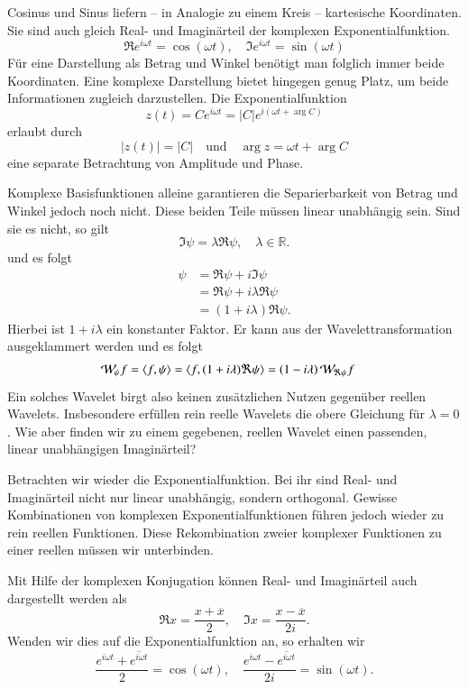 Cosinus und Sinus liefern -- in Analogie zu einem Kreis -- kartesische Koordinaten. 
Sie sind auch gleich Real- und Imaginärteil der komplexen Exponentialfunktion.
\[
\Re e^{i\omega t} = \cos(\omega t), \quad \Im e^{i\omega t} = \sin(\omega t)
\]
Für eine Darstellung als Betrag und Winkel benötigt man folglich immer beide Koordinaten.
Eine komplexe Darstellung bietet hingegen genug Platz, um beide Informationen zugleich darzustellen.
Die Exponentialfunktion
\[
	z(t) = Ce^{i\omega t} = |C|e^{i(\omega t + \arg C)}
\]
erlaubt durch 
\[
	|z(t)| = |C| 
	\quad \text{und}\quad
	\arg z = \omega t + \arg C
\]
eine separate Betrachtung von Amplitude und Phase.


Komplexe Basisfunktionen alleine garantieren die Separierbarkeit von Betrag und Winkel jedoch noch nicht.
Diese beiden Teile müssen linear unabhängig sein.
Sind sie es nicht, so gilt
\[\Im \psi = \lambda \Re \psi, \quad \lambda \in \mathbb R.\]
und es folgt
\begin{align*}
	\psi &= \Re \psi + i \Im \psi\\
	&= \Re \psi + i\lambda \Re \psi\\
	&= (1+i\lambda) \Re \psi.
\end{align*}
Hierbei ist $1+i\lambda$ ein konstanter Faktor. 
Er kann aus der Wavelettransformation ausgeklammert werden und es folgt
\begin{align*}
	\Wave_\psi\! f 
	= \langle f, \psi \rangle
	&= \langle f, (1+i\lambda) \Re \psi \rangle
	= (1-i\lambda) \Wave_{\Re\psi}\! f
\end{align*}
Ein solches Wavelet birgt also keinen zusätzlichen Nutzen gegenüber reellen Wavelets.
Insbesondere erfüllen rein reelle Wavelets die obere Gleichung für $\lambda=0$.
Wie aber finden wir zu einem gegebenen, reellen Wavelet einen passenden, linear unabhängigen Imaginärteil?

Betrachten wir wieder die Exponentialfunktion.
Bei ihr sind Real- und Imaginärteil nicht nur linear unabhängig, sondern orthogonal.
Gewisse Kombinationen von komplexen Exponentialfunktionen führen jedoch wieder zu rein reellen Funktionen.
Diese Rekombination zweier komplexer Funktionen zu einer reellen müssen wir unterbinden.

Mit Hilfe der komplexen Konjugation können Real- und Imaginärteil auch dargestellt werden als
\[
\Re x = \frac{x + \overline x}{2} 
,\quad
\Im x = \frac{x - \overline x}{2i}.
\]
Wenden wir dies auf die Exponentialfunktion an, so erhalten wir
\begin{equation}
	\frac{e^{i\omega t} + \overline{e^{i\omega t}}}{2} = \cos(\omega t)
	,\quad
	\frac{e^{i\omega t} - \overline{e^{i\omega t}}}{2i} = \sin(\omega t). \label{complex:euler}
\end{equation}

